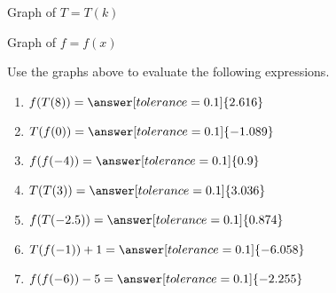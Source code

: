 \documentclass{ximera}
\begin{document}
Graph of $T=T(k)$

\begin{center}
\end{center}






Graph of $f=f(x)$

\begin{center}
\end{center}




\begin{question}


Use the graphs above to evaluate the following expressions.



\begin{enumerate}

\item $f(T(8)) = \answer[tolerance=0.1]{2.616}$ \\

\item $T(f(0)) = \answer[tolerance=0.1]{-1.089}$ \\

\item $f(f(-4)) = \answer[tolerance=0.1]{0.9}$ \\

\item $T(T(3)) = \answer[tolerance=0.1]{3.036}$ \\

\item $f(T(-2.5)) = \answer[tolerance=0.1]{0.874}$ \\

\item $T(f(-1))+1 = \answer[tolerance=0.1]{-6.058}$ \\

\item $f(f(-6)) -5 = \answer[tolerance=0.1]{-2.255}$ \\

\end{enumerate}








\end{question}
\end{document}
